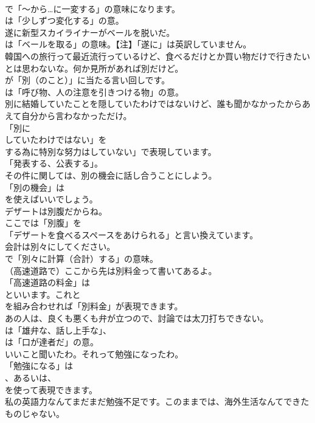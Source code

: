 \documentclass[8pt]{extreport}
\begin{document}
\begin{CJK}{UTF8}{min}
\\	で「～から…に一変する」の意味になります。
\\	は「少しずつ変化する」の意。	
\\	遂に新型スカイライナーがベールを脱いだ。 
\\	は「ベールを取る」の意味。【注】「遂に」は英訳していません。	
\\	韓国への旅行って最近流行っているけど、食べるだけとか買い物だけで行きたいとは思わないな。何か見所があれば別だけど。 
\\	が「別（のこと）」に当たる言い回しです。
\\	は「呼び物、人の注意を引きつける物」の意。	
\\	別に結婚していたことを隠していたわけではないけど、誰も聞かなかったからあえて自分から言わなかっただけ。 
\\	「別に 
\\	していたわけではない」を
\\	する為に特別な努力はしていない」で表現しています。
\\	「発表する、公表する」。	
\\	その件に関しては、別の機会に話し合うことにしよう。 
\\	「別の機会」は
\\	を使えばいいでしょう。	
\\	デザートは別腹だからね。 
\\	ここでは「別腹」を
\\	「デザートを食べるスペースをあけられる」と言い換えています。	
\\	会計は別々にしてください。 
\\	で「別々に計算（合計）する」の意味。	
\\	（高速道路で）ここから先は別料金って書いてあるよ。 
\\	「高速道路の料金」は
\\	といいます。これと
\\	を組み合わせれば「別料金」が表現できます。	
\\	あの人は、良くも悪くも弁が立つので、討論では太刀打ちできない。 
\\	は「雄弁な、話し上手な」、
\\	は「口が達者だ」の意。	
\\	いいこと聞いたわ。それって勉強になったわ。 
\\	「勉強になる」は
\\	、あるいは、
\\	を使って表現できます。	
\\	私の英語力なんてまだまだ勉強不足です。このままでは、海外生活なんてできたものじゃない。 

\end{CJK}
\end{document}
